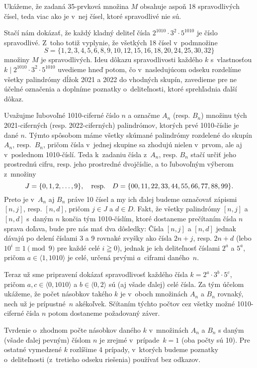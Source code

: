 {%
Ukážeme, že zadaná 35-prvková množina $M$ obsahuje aspoň 18
spravodlivých čísel, teda viac ako je v~nej čísel,
ktoré spravodlivé nie sú.

Stačí nám dokázať, že každý kladný deliteľ čísla $2^{1010}\cdot 3^2\cdot 5^{1010}$
je číslo spravodlivé. Z~toho totiž vyplynie, že všetkých 18 čísel
v~podmnožine
$$
S=\{1,2,3,4,5,6,8,9,10,12,15,16,18,20,24,25,30,32\}
$$
množiny $M$ je spravodlivých. Ideu dôkazu spravodlivosti každého
$k$ s~vlastnosťou $k\mid 2^{1010}\cdot 3^2\cdot 5^{1010}$ uvedieme
hneď potom, čo v~nasledujúcom odseku rozdelíme všetky palindrómy
dĺžok 2021 a 2022 do vhodných skupín, zavedieme pre ne účelné označenia
a doplníme poznatky o~deliteľnosti, ktoré sprehľadnia ďalší dôkaz.

Uvažujme ľubovoľné 1010-ciferné číslo $n$ a označme $A_n$ (resp.
$B_n$) množinu tých 2021-ciferných (resp. 2022-ciferných) palindrómov,
ktorých prvé 1010-číslie je dané $n$. Týmto spôsobom máme všetky skúmané
palindrómy rozdelené do skupín $A_n$, resp.~$B_n$,
pričom čísla v~jednej skupine sa zhodujú nielen v~prvom, ale aj
v~poslednom 1010-číslí. Teda k~zadaniu čísla z~$A_n$, resp. $B_n$ stačí
určiť jeho prostrednú cifru, resp. jeho prostredné dvojčíslie, a
to ľubovoľným výberom z~množiny
$$
J=\{0,1,2,\dots,9\},\quad\hbox{resp.}\quad
D=\{00,11,22,33,44,55,66,77,88,99\}.
$$
Preto je v~$A_n$ aj $B_n$ práve 10 čísel a my ich ďalej budeme
označovať zápismi $[n,j]$, resp. $[n,d]$,
pričom $j\in J$ a $d\in D$. Fakt, že všetky palindrómy $[n,j]$ a
$[n,d]$ s~daným $n$ končia tým 1010-číslím, ktoré dostaneme prečítaním čísla $n$
sprava doľava, bude pre nás mať dva dôsledky: Čísla $[n,j]$ a $[n,d]$
jednak dávajú po delení číslami 3 a 9
rovnaké zvyšky ako čísla $2n+j$, resp. $2n+d$ (lebo
$10^i\equiv1\pmod{9}$ pre každé celé $i\geqq0$),
jednak je ich deliteľnosť číslami $2^a$ a $5^a$, pričom
$a\in\langle1,1010\rangle$ je celé, určená
prvými $a$~ciframi daného~$n$.

Teraz už sme pripravení dokázať spravodlivosť každého čísla
$k=2^a\cdot 3^b\cdot 5^c$, pričom $a,c\in\langle0,1010\rangle$ a
$b\in\langle0,2\rangle$ sú (aj všade ďalej) celé čísla.
Za tým účelom ukážeme, že počet násobkov takého $k$ je
v~oboch množinách $A_n$ a $B_n$ rovnaký, nech už je prípustné~$n$ akékoľvek.
Sčítaním týchto počtov cez všetky možné 1010-ciferné čísla $n$
potom dostaneme požadovaný záver.

Tvrdenie o~zhodnom počte násobkov daného $k$ v~množinách
$A_n$ a $B_n$ s daným (všade ďalej pevným) číslom $n$ je zrejmé
v~prípade~$k=1$ (oba počty sú 10).
Pre ostatné vymedzené $k$ rozlíšime 4 prípady,
v~ktorých budeme poznatky o~deliteľnosti (z~tretieho odseku riešenia)
používať bez odkazov.

}
